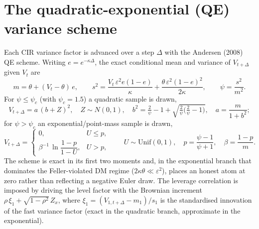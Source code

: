 \documentclass[11pt]{article}
\begin{document}
\section{The quadratic-exponential (QE) variance scheme}
Each CIR variance factor is advanced over a step \(\Delta\) with the Andersen (2008) QE scheme.
Writing \(e=e^{-\kappa\Delta}\), the exact conditional mean and variance of \(V_{t+\Delta}\) given
\(V_t\) are
\begin{equation}
m = \theta + (V_t-\theta)\,e, \qquad
s^2 = \frac{V_t\,\varepsilon^2 e(1-e)}{\kappa} + \frac{\theta\,\varepsilon^2(1-e)^2}{2\kappa},
\qquad \psi = \frac{s^2}{m^2}.
\end{equation}
For \(\psi\le\psi_c\) (with \(\psi_c=1.5\)) a quadratic sample is drawn,
\begin{equation}
V_{t+\Delta} = a\,(b+Z)^2,\quad Z\sim N(0,1),\quad
b^2 = \tfrac{2}{\psi}-1+\sqrt{\tfrac{2}{\psi}\big(\tfrac{2}{\psi}-1\big)},\quad
a=\frac{m}{1+b^2};
\end{equation}
for \(\psi>\psi_c\) an exponential/point-mass sample is drawn,
\begin{equation}
V_{t+\Delta} = \begin{cases} 0, & U\le p,\\[2pt] \beta^{-1}\,\ln\dfrac{1-p}{1-U}, & U>p, \end{cases}
\qquad U\sim\mathrm{Unif}(0,1),\quad p=\frac{\psi-1}{\psi+1},\quad \beta=\frac{1-p}{m}.
\end{equation}
The scheme is exact in its first two moments and, in the exponential branch that dominates the
Feller-violated DM regime (\(2\kappa\theta\ll\varepsilon^2\)), places an honest atom at zero rather
than reflecting a negative Euler draw. The leverage correlation is imposed by driving the level
factor with the Brownian increment \(\rho\,\xi_1+\sqrt{1-\rho^2}\,Z_x\), where
\(\xi_1=(V_{1,t+\Delta}-m_1)/s_1\) is the standardised innovation of the fast variance factor (exact
in the quadratic branch, approximate in the exponential).
\end{document}
